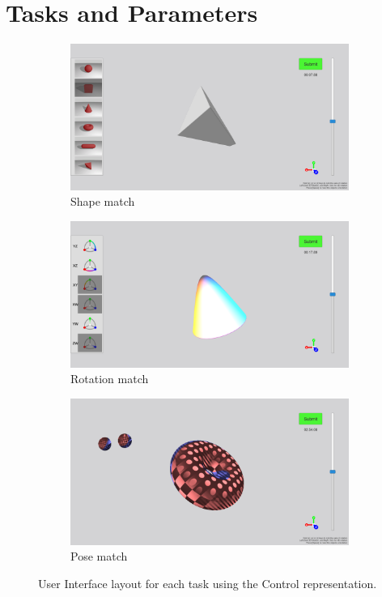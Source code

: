 \documentclass{l4proj}
\begin{document}
\section{Tasks and Parameters}

\begin{figure}
  \begin{subfigure}[b]{0.33\textwidth}
    \includegraphics[width=\textwidth]{images/tasks/shape_match.PNG}
    \caption{
      Shape match
    }
    \label{fig:task_s}
  \end{subfigure}
  \begin{subfigure}[b]{0.33\textwidth}
    \includegraphics[width=\textwidth]{images/tasks/rotation_match.PNG}
    \caption{
      Rotation match
    }
    \label{fig:task_r}
  \end{subfigure}
  \begin{subfigure}[b]{0.33\textwidth}
    \includegraphics[width=\textwidth]{images/tasks/pose_match.PNG}
    \caption{
      Pose match
    }
    \label{fig:task_p}
  \end{subfigure}
  \label{fig:tasks}
  \caption{User Interface layout for each task using the Control representation.}
\end{figure}
\end{document}
